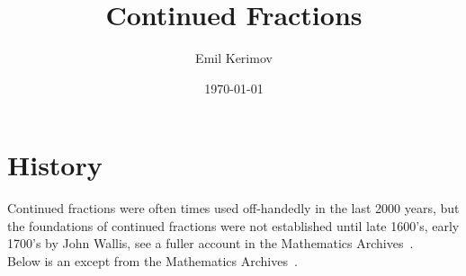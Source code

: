 \documentclass[a4paper]{article}
\title{Continued Fractions}
\author{Emil Kerimov}
\date{\today}
\begin{document}
    \maketitle

    \newtheorem{theorem}{Theorem}[section]
    \newtheorem{corollary}{Corollary}[theorem]
    \newtheorem{lemma}[theorem]{Lemma}
    \newtheorem{definition}{Definition}[section]

    \newcommand{\CFDots}[]{\genfrac{}{}{0pt}{0}{}{\ddots}}

    \section{History}\label{sec:history}
    Continued fractions were often times used off-handedly in the last 2000 years, but the foundations of continued
    fractions were not established until late 1600's, early 1700's by John Wallis, see a fuller account in the Mathematics
    Archives~\cite{history_website}.
    \\
    Below is an except from the Mathematics Archives~\cite{history_website}.
\end{document}
